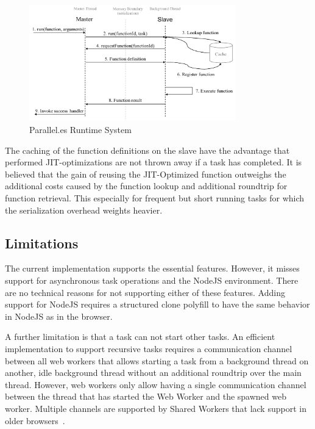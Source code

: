 \begin{figure}
	\centering
	\includegraphics[width=0.8\textwidth]{runtime-system.pdf}

	\caption{Parallel.es Runtime System}
	\label{fig:runtime-system}
\end{figure}

The caching of the function definitions on the slave have the advantage that performed JIT-optimizations are not thrown away if a task has completed. It is believed that the gain of reusing the JIT-Optimized function outweighs the additional costs caused by the function lookup and additional roundtrip for function retrieval. This especially for frequent but short running tasks for which the serialization overhead weights heavier. 


\subsection{Limitations}
The current implementation supports the essential features. However, it misses support for asynchronous task operations and the NodeJS environment. There are no technical reasons for not supporting either of these features. Adding support for NodeJS requires a structured clone polyfill to have the same behavior in NodeJS as in the browser.

A further limitation is that a task can not start other tasks. An efficient implementation to support recursive tasks requires a communication channel between all web workers that allows starting a task from a background thread on another, idle background thread without an additional roundtrip over the main thread. However, web workers only allow having a single communication channel between the thread that has started the Web Worker and the spawned web worker. Multiple channels are supported by Shared Workers that lack support in older browsers~\cite[section 4.6.4]{w3cWebWorker}.